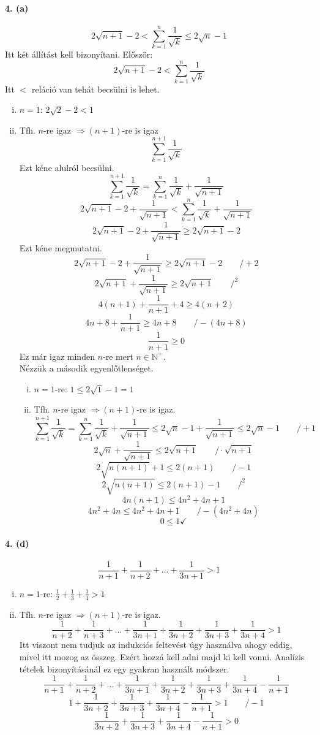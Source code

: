 \documentclass[12pt,a4paper,fleqn]{article}
\newcommand{\myparagraph}[1]{\paragraph{#1}\mbox{}}
\begin{document}
\myparagraph{4. (a)}
\[ 2\sqrt{n+1} - 2 < \sum_{k=1}^{n} \dfrac{1}{\sqrt{k}} \leq 2\sqrt{n}-1 \]
Itt két állítást kell bizonyítani. Először:
\[ 2 \sqrt{n+1} - 2 < \sum_{k=1}^{n} \dfrac{1}{\sqrt{k}} \]
Itt $<$ reláció van tehát becsülni is lehet.
\begin{enumerate}[i.]
  \item $n=1$: $2 \sqrt{2}-2 < 1$ \checkmark
  \item Tfh. $n$-re igaz $\Rightarrow (n+1)$-re is igaz
  \[\sum_{k=1}^{n+1} \dfrac{1}{\sqrt{k}} \]
  Ezt kéne alulról becsülni.
  \[ \sum_{k=1}^{n+1} \dfrac{1}{\sqrt{k}} = \sum_{k=1}^{n} \dfrac{1}{\sqrt{k}}
    + \dfrac{1}{\sqrt{n+1}}
  \]
  \[ 2\sqrt{n+1} - 2 + \dfrac{1}{\sqrt{n+1}} < \sum_{k=1}^{n} \dfrac{1}{\sqrt{k}}
    + \dfrac{1}{\sqrt{n+1}}
  \]
  \[ 2\sqrt{n+1} - 2 + \dfrac{1}{\sqrt{n+1}} \geq 2\sqrt{n+1} - 2 \]
  Ezt kéne megmutatni.
  \[ 2\sqrt{n+1} - 2 + \dfrac{1}{\sqrt{n+1}} \geq 2\sqrt{n+1} - 2 \qquad /+2 \]
  \[ 2\sqrt{n+1} + \dfrac{1}{\sqrt{n+1}} \geq 2\sqrt{n+1} \qquad /^2 \]
  \[ 4(n+1) + \dfrac{1}{n+1} + 4 \geq 4(n+2) \]
  \[ 4n+8+\dfrac{1}{n+1} \geq 4n+8 \qquad /-(4n+8)\]
  \[ \dfrac{1}{n+1} \geq 0 \]
  Ez már igaz minden $n$-re mert $n \in \mathbb{N}^{+}$. \\
  Nézzük a második egyenlőtlenséget.
  \begin{enumerate}[i.]
    \item $n=1$-re: $1 \leq 2\sqrt{1}-1 = 1$ \checkmark
    \item Tfh. $n$-re igaz $\Rightarrow (n+1)$-re is igaz.
    \[ \sum_{k=1}^{n+1} \dfrac{1}{\sqrt{k}} = \sum_{k=1}^{n} \dfrac{1}{\sqrt{k}}
      + \dfrac{1}{\sqrt{n+1}} \leq 2\sqrt{n}-1 + \dfrac{1}{\sqrt{n+1}}
      \leq 2\sqrt{n}-1 \qquad /+1
    \]
    \[ 2\sqrt{n} + \dfrac{1}{\sqrt{n+1}} \leq 2\sqrt{n+1} \qquad / \cdot \sqrt{n+1} \]
    \[ 2\sqrt{n(n+1)} + 1 \leq 2(n+1) \qquad /-1 \]
    \[ 2\sqrt{n(n+1)} \leq 2(n+1) -1 \qquad /^2 \]
    \[ 4n(n+1) \leq 4n^2+4n+1 \]
    \[ 4n^2+4n \leq 4n^2+4n+1 \qquad /-(4n^2+4n)\]
    \[ 0 \leq 1 \checkmark \]
  \end{enumerate}

\end{enumerate}


\myparagraph{4. (d)}
\[ \dfrac{1}{n+1} + \dfrac{1}{n+2} + ... + \dfrac{1}{3n+1} > 1 \]
\begin{enumerate}[i.]
  \item $n=1$-re: $\frac{1}{2} + \frac{1}{3} + \frac{1}{4} > 1 $ \checkmark
  \item Tfh. $n$-re igaz $\Rightarrow (n+1)$-re is igaz.
  \[ \dfrac{1}{n+2} + \dfrac{1}{n+3} + ... + \dfrac{1}{3n+1} + \dfrac{1}{3n+2}
    + \dfrac{1}{3n+3} + \dfrac{1}{3n+4} > 1
  \]
  Itt viszont nem tudjuk az indukciós feltevést úgy használva ahogy eddig, mivel
  itt mozog az összeg. Ezért hozzá kell adni majd ki kell vonni. Analízis tételek
  bizonyításánál ez egy gyakran használt módszer.
  \[ \dfrac{1}{n+1} + \dfrac{1}{n+2} + ... + \dfrac{1}{3n+1} + \dfrac{1}{3n+2}
    + \dfrac{1}{3n+3} + \dfrac{1}{3n+4} - \dfrac{1}{n+1}
  \]
  \[ 1 + \dfrac{1}{3n+2} + \dfrac{1}{3n+3} + \dfrac{1}{3n+4} - \dfrac{1}{n+1} > 1 \qquad /-1 \]
  \[ \dfrac{1}{3n+2} + \dfrac{1}{3n+3} + \dfrac{1}{3n+4} - \dfrac{1}{n+1} > 0 \]
\end{enumerate}
\end{document}
